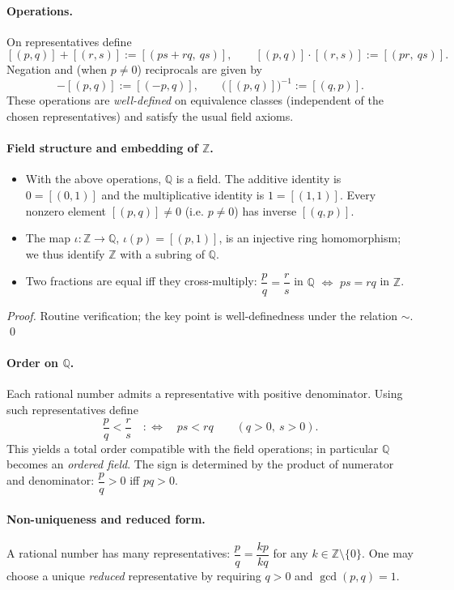 \documentclass[12pt,a4paper]{article}
\newcommand{\Z}{\mathbb{Z}}
\newcommand{\Q}{\mathbb{Q}}
\theoremstyle{plain}
\theoremstyle{definition}
\theoremstyle{remark}
\begin{document}
\paragraph{Operations.} On representatives define
\[
	[(p,q)] + [(r,s)] := [(ps+rq,\ qs)],\qquad [(p,q)]\cdot[(r,s)] := [(pr,\ qs)].
\]
Negation and (when $p\ne0$) reciprocals are given by
\[
	-[(p,q)] := [(-p,q)],\qquad \big([(p,q)]\big)^{-1} := [(q,p)].
\]
These operations are \emph{well-defined} on equivalence classes (independent of the chosen representatives) and satisfy the usual field axioms.

\paragraph{Field structure and embedding of $\Z$.}
\begin{itemize}[leftmargin=*]
	\item With the above operations, $\Q$ is a field. The additive identity is $0=[(0,1)]$ and the multiplicative identity is $1=[(1,1)]$. Every nonzero element $[(p,q)]\ne0$ (i.e. $p\ne0$) has inverse $[(q,p)]$.
	\item The map $\iota: \Z\to\Q$, $\iota(p)=[(p,1)]$, is an injective ring homomorphism; we thus identify $\Z$ with a subring of $\Q$.
	\item Two fractions are equal iff they cross-multiply: $\dfrac{p}{q}=\dfrac{r}{s}$ in $\Q$ $\iff$ $ps=rq$ in $\Z$.
\end{itemize}
\emph{Proof.} Routine verification; the key point is well-definedness under the relation $\sim$. \qed

\paragraph{Order on $\Q$.} Each rational number admits a representative with positive denominator. Using such representatives define
\[
	\frac{p}{q} < \frac{r}{s} \quad:\iff\quad p s < r q \qquad (q>0,\ s>0).
\]
This yields a total order compatible with the field operations; in particular $\Q$ becomes an \emph{ordered field}. The sign is determined by the product of numerator and denominator: $\dfrac{p}{q}>0$ iff $pq>0$.


\paragraph{Non-uniqueness and reduced form.} A rational number has many representatives: $\dfrac{p}{q}=\dfrac{kp}{kq}$ for any $k\in\Z\setminus\{0\}$. One may choose a unique \emph{reduced} representative by requiring $q>0$ and $\gcd(p,q)=1$.
\end{document}
